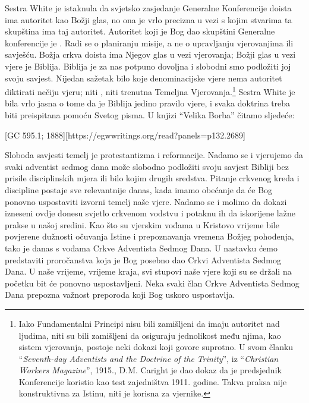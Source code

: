 Sestra White je istaknula da svjetsko zasjedanje Generalne Konferencije doista ima autoritet kao Božji glas, no ona je vrlo precizna u vezi s kojim stvarima ta skupština ima taj autoritet. Autoritet koji je Bog dao skupštini Generalne konferencije je . Radi se o planiranju misije, a ne o upravljanju vjerovanjima ili savješću. Božja crkva doista ima Njegov glas u vezi vjerovanja; Božji glas u vezi vjere je Biblija. Biblija je za nas potpuno dovoljna i slobodni smo podložiti joj svoju savjest. Nijedan sažetak bilo koje denominacijske vjere nema autoritet diktirati nečiju vjeru; niti , niti trenutna Temeljna Vjerovanja.\footnote{Iako Fundamentalni Principi nisu bili zamišljeni da imaju autoritet nad ljudima, niti su bili zamišljeni da osiguraju jednolikost među njima, kao sistem vjerovanja, postoje neki dokazi koji govore suprotno. U svom članku “\textit{Seventh-day Adventists and the Doctrine of the Trinity}”, iz “\textit{Christian Workers Magazine}”, 1915., D.M. Caright je dao dokaz da je predsjednik Konferencije koristio  kao test zajedništva 1911. godine. Takva praksa nije konstruktivna za Istinu, niti je korisna za vjernike.} Sestra White je bila vrlo jasna o tome da je Biblija jedino pravilo vjere, i svaka doktrina treba biti preispitana pomoću Svetog pisma. U knjizi “Velika Borba” čitamo sljedeće:

[GC 595.1; 1888][https://egwwritings.org/read?panels=p132.2689]

Sloboda savjesti temelj je protestantizma i reformacije. Nadamo se i vjerujemo da svaki adventist sedmog dana može slobodno podložiti svoju savjest Bibliji bez prisile disciplinskih mjera ili bilo kojim drugih sredstva. Pitanje crkvenog kreda i discipline postaje sve relevantnije danas, kada imamo obećanje da će Bog ponovno uspostaviti izvorni temelj naše vjere. Nadamo se i molimo da dokazi izneseni ovdje donesu svjetlo crkvenom vodstvu i potaknu ih da iskorijene lažne prakse u našoj sredini. Kao što su vjerskim vođama u Kristovo vrijeme bile povjerene dužnosti očuvanja Istine i prepoznavanja vremena Božjeg pohođenja, tako je danas s vođama Crkve Adventista Sedmog Dana. U nastavku ćemo predstaviti proročanstva koja je Bog posebno dao Crkvi Adventista Sedmog Dana. U naše vrijeme, vrijeme kraja, svi stupovi naše vjere koji su se držali na početku bit će ponovno uspostavljeni. Neka svaki član Crkve Adventista Sedmog Dana prepozna važnost preporoda koji Bog uskoro uspostavlja.
